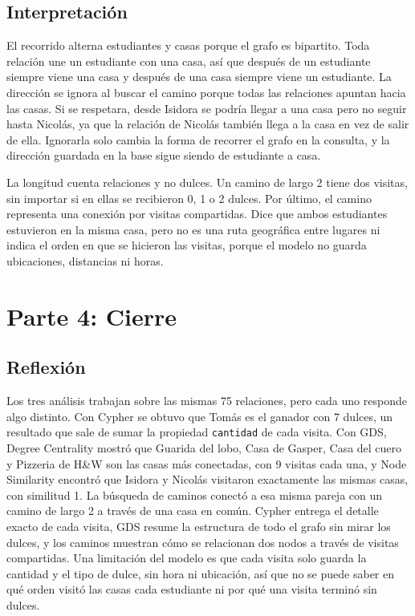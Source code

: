 \documentclass[11pt,a4paper]{article}
\begin{document}
\subsection{Interpretación}

El recorrido alterna estudiantes y casas porque el grafo es bipartito. Toda relación une un
estudiante con una casa, así que después de un estudiante siempre viene una casa y después de una
casa siempre viene un estudiante. La dirección se ignora al buscar el camino porque todas las
relaciones apuntan hacia las casas. Si se respetara, desde Isidora se podría llegar a una casa pero
no seguir hasta Nicolás, ya que la relación de Nicolás también llega a la casa en vez de salir de
ella. Ignorarla solo cambia la forma de recorrer el grafo en la consulta, y la dirección guardada
en la base sigue siendo de estudiante a casa.

La longitud cuenta relaciones y no dulces. Un camino de largo 2 tiene dos visitas, sin importar si
en ellas se recibieron 0, 1 o 2 dulces. Por último, el camino representa una conexión por visitas
compartidas. Dice que ambos estudiantes estuvieron en la misma casa, pero no es una ruta geográfica
entre lugares ni indica el orden en que se hicieron las visitas, porque el modelo no guarda
ubicaciones, distancias ni horas.

\section{Parte 4: Cierre}

\subsection{Reflexión}

Los tres análisis trabajan sobre las mismas 75 relaciones, pero cada uno responde algo distinto.
Con Cypher se obtuvo que Tomás es el ganador con 7 dulces, un resultado que sale de sumar la
propiedad \texttt{cantidad} de cada visita. Con GDS, Degree Centrality mostró que Guarida del
lobo, Casa de Gasper, Casa del cuero y Pizzeria de H\&W son las casas más conectadas, con 9 visitas
cada una, y Node Similarity encontró que Isidora y Nicolás visitaron exactamente las
mismas casas, con similitud 1. La búsqueda de caminos conectó a esa misma pareja con un camino de largo 2 a través de
una casa en común. Cypher entrega el detalle exacto de cada visita, GDS resume la estructura de
todo el grafo sin mirar los dulces, y los caminos muestran cómo se relacionan dos nodos a través
de visitas compartidas. Una limitación del modelo es que cada visita solo guarda la cantidad y el
tipo de dulce, sin hora ni ubicación, así que no se puede saber en qué orden visitó las casas cada
estudiante ni por qué una visita terminó sin dulces.
\end{document}
